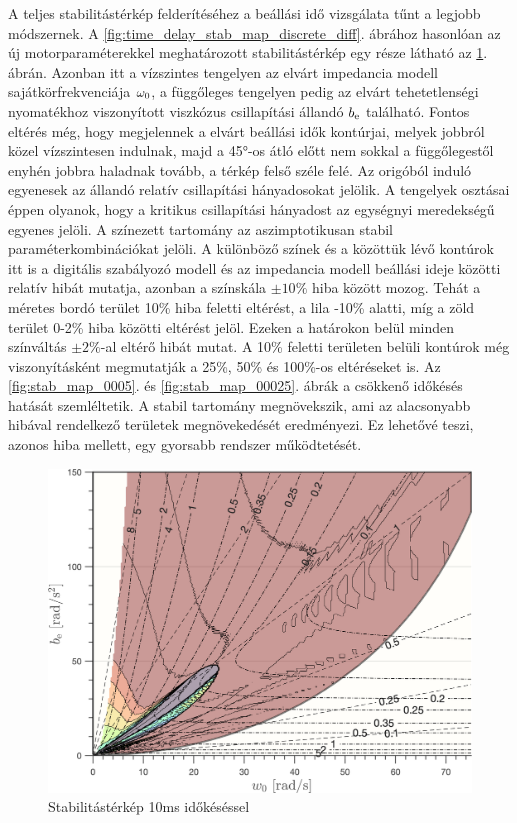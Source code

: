 A teljes stabilitástérkép felderítéséhez a beállási idő vizsgálata tűnt a legjobb módszernek. A \ref{fig:time_delay_stab_map_discrete_diff}. 
ábrához hasonlóan az új motorparaméterekkel meghatározott stabilitástérkép egy része látható az \ref{fig:stab_map_001}. ábrán.
Azonban itt a vízszintes tengelyen az elvárt impedancia modell sajátkörfrekvenciája \(\omega_{\mathrm{0}}\), a függőleges 
tengelyen pedig az elvárt tehetetlenségi nyomatékhoz viszonyított viszkózus csillapítási állandó \(b_{\mathrm{e}}\) található.
Fontos eltérés még, hogy megjelennek a elvárt beállási idők kontúrjai, melyek jobbról közel vízszintesen indulnak, 
majd a 45°-os átló előtt nem sokkal a függőlegestől enyhén jobbra haladnak tovább, a térkép felső széle felé. 
Az origóból induló egyenesek az állandó relatív csillapítási hányadosokat jelölik. A tengelyek osztásai éppen olyanok, 
hogy a kritikus csillapítási hányadost az egységnyi meredekségű egyenes jelöli. A színezett tartomány az aszimptotikusan 
stabil paraméterkombinációkat jelöli. A különböző színek és a közöttük lévő kontúrok itt is a digitális szabályozó modell és az 
impedancia modell beállási ideje közötti relatív hibát mutatja, azonban a színskála \(\pm 10\%\) hiba között mozog. 
Tehát a méretes bordó terület 10\% hiba feletti eltérést, a lila -10\% alatti, míg a zöld terület 0-2\% hiba közötti 
eltérést jelöl. Ezeken a határokon belül minden színváltás \(\pm2\%\)-al eltérő hibát mutat. A 10\% feletti 
területen belüli kontúrok még viszonyításként megmutatják a 25\%, 50\% és 100\%-os eltéréseket is. 
Az \ref{fig:stab_map_0005}. és \ref{fig:stab_map_00025}. ábrák a csökkenő időkésés hatását szemléltetik. 
A stabil tartomány megnövekszik, ami az alacsonyabb hibával rendelkező területek 
megnövekedését eredményezi. Ez lehetővé teszi, azonos hiba mellett, egy gyorsabb rendszer működtetését. 
\begin{figure}[H]
    \begin{center}
    \includegraphics[width=14cm]{images/stab_map_001.png}
    \caption{Stabilitástérkép 10ms időkéséssel}\label{fig:stab_map_001}
    \end{center}
\end{figure}
